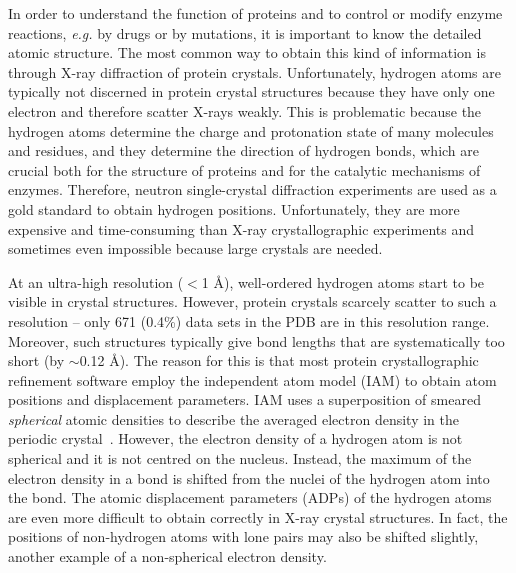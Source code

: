 \documentclass[preprint,dvipsnames]{iucr}              %
\begin{document}
In order to understand the function of proteins and to control or modify enzyme reactions, {\em e.g.} 
by drugs or by mutations, it 
is important to know the detailed atomic structure.  
The most common way to obtain this kind of
information is through X-ray diffraction of protein crystals.
Unfortunately, hydrogen atoms are typically not discerned in protein crystal structures because they have only one electron and therefore scatter X-rays  weakly. 
This is problematic because the hydrogen atoms determine the charge and protonation state of many molecules and residues, and they determine the direction of hydrogen bonds, which are crucial both for the structure of proteins and for the catalytic mechanisms of enzymes.
Therefore, neutron single-crystal diffraction experiments are used as a gold standard to obtain hydrogen positions. Unfortunately, they are more expensive and time-consuming than X-ray crystallographic experiments and sometimes even impossible because large crystals are needed.

At an ultra-high resolution ($<$1 \AA), well-ordered hydrogen atoms start to be visible in crystal structures.
However, protein crystals scarcely scatter to such a resolution -- 
only 671 (0.4\%) data sets in the PDB are in this resolution range.
Moreover, such structures typically give  bond lengths that are systematically too short (by $\sim$0.12 \AA). The reason for this is that most protein crystallographic 
refinement software employ the independent atom model (IAM) 
to obtain atom positions and displacement parameters.  
IAM uses a superposition of smeared {\em spherical} atomic densities
to describe the averaged electron 
density in the periodic crystal~\cite{coppens1997x}.
However, the electron density of a hydrogen atom is not spherical and it is not centred on the nucleus. Instead, the maximum of the electron density in a  bond is shifted 
from the nuclei of the hydrogen atom into the bond.   
The atomic displacement parameters (ADPs) of the hydrogen atoms
are even more difficult to obtain correctly in X-ray crystal structures. In fact, the positions of  
non-hydrogen atoms with lone pairs may also be shifted slightly, another example of a non-spherical electron density. 
\end{document}
